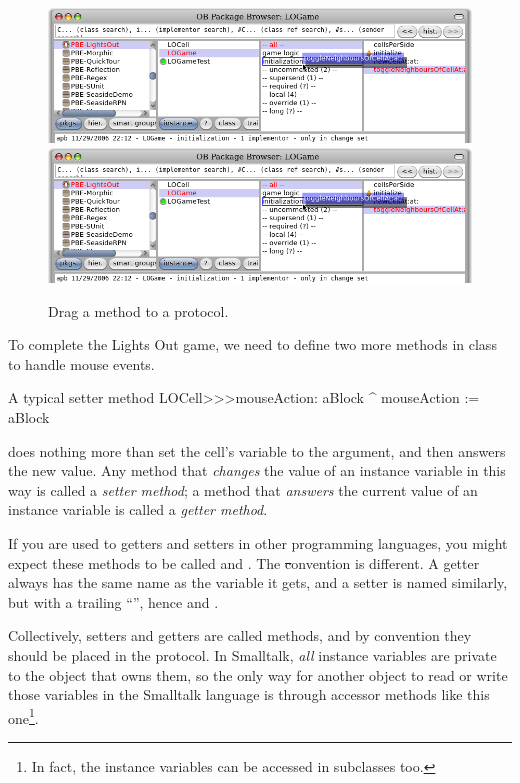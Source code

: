\documentclass[a4paper,10pt,twoside]{book}
\begin{document}
\begin{figure}[htbp]
   \centering
   \ifluluelse
		{\includegraphics[width=\textwidth]{DragMethod} }
		{\includegraphics[scale=0.7]{DragMethod} }
   \caption{Drag a method to a protocol.}
\end{figure}

To complete the Lights Out game, we need to define two more methods in class  to handle mouse events.
\begin{method}[mouseAction:]{A typical setter method}
LOCell>>>mouseAction: aBlock
   ^ mouseAction := aBlock
\end{method}

 does nothing more than set the cell's  variable to the argument, and then answers the new value.
Any method that \emph{changes} the value of an instance variable in this way is called a \emph{setter method}; a method that \emph{answers} the current value of an instance variable is called a \emph{getter method}.

If you are used to getters and setters in other programming languages, you might expect these methods to be called  and .
The \st convention is different.
A getter always has the same name as the variable it gets, and a setter is named similarly, but with a trailing ``\ct{:}'', hence  and .

Collectively, setters and getters are called   methods, and by convention they should be placed in the  protocol.
In Smalltalk, \emph{all} instance variables are private to the object that owns them, so the only way for another object to read or write those variables in the Smalltalk language is through accessor methods like this one\footnote{In fact, the instance variables can be accessed in subclasses too.}.
\end{document}
